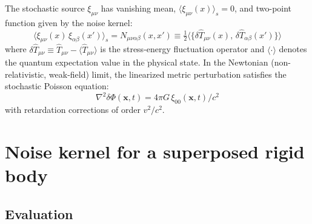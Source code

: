 \documentclass[12pt,a4paper]{article}
\begin{document}
The stochastic source $\xi_{\mu\nu}$ has vanishing mean,
$\langle\xi_{\mu\nu}(x)\rangle_s = 0$, and two-point function given by the noise kernel:
\begin{equation}
\langle\xi_{\mu\nu}(x)\,\xi_{\alpha\beta}(x')\rangle_s
= N_{\mu\nu\alpha\beta}(x,x')
\equiv \tfrac{1}{2}\langle\{\delta\hat{T}_{\mu\nu}(x),\,\delta\hat{T}_{\alpha\beta}(x')\}\rangle
\label{eq:noise_kernel_def}
\end{equation}
where $\delta\hat{T}_{\mu\nu} \equiv \hat{T}_{\mu\nu} - \langle\hat{T}_{\mu\nu}\rangle$
is the stress-energy fluctuation operator and $\langle\cdot\rangle$ denotes the quantum
expectation value in the physical state. In the Newtonian (non-relativistic, weak-field)
limit, the linearized metric perturbation satisfies the stochastic Poisson equation:
\begin{equation}
\nabla^2 \delta\Phi(\mathbf{x},t) = 4\pi G\,\xi_{00}(\mathbf{x},t)/c^2
\label{eq:poisson_stochastic}
\end{equation}
with retardation corrections of order $v^2/c^2$.

\section{Noise kernel for a superposed rigid body}
\label{sec:noise_kernel}

\subsection{Evaluation}
\end{document}
